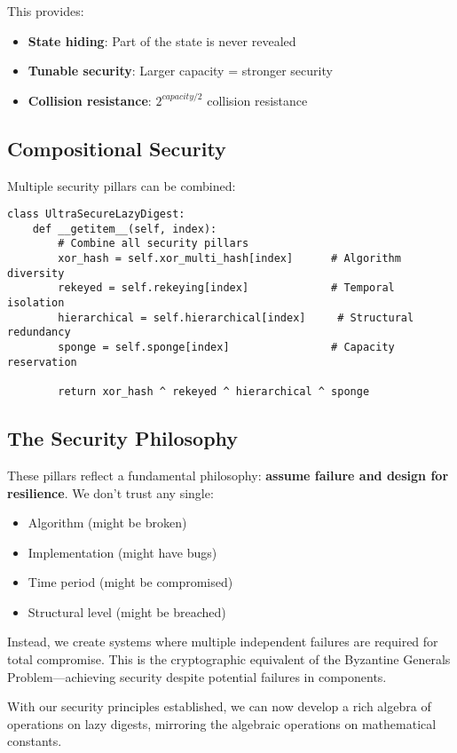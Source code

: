 \documentclass[11pt]{article}
\begin{document}
This provides:
\begin{itemize}
\item \textbf{State hiding}: Part of the state is never revealed
\item \textbf{Tunable security}: Larger capacity = stronger security
\item \textbf{Collision resistance}: $2^{capacity/2}$ collision resistance
\end{itemize}

\subsection{Compositional Security}

Multiple security pillars can be combined:

\begin{lstlisting}
class UltraSecureLazyDigest:
    def __getitem__(self, index):
        # Combine all security pillars
        xor_hash = self.xor_multi_hash[index]      # Algorithm diversity
        rekeyed = self.rekeying[index]             # Temporal isolation
        hierarchical = self.hierarchical[index]     # Structural redundancy
        sponge = self.sponge[index]                # Capacity reservation
        
        return xor_hash ^ rekeyed ^ hierarchical ^ sponge
\end{lstlisting}

\subsection{The Security Philosophy}

These pillars reflect a fundamental philosophy: \textbf{assume failure and design for resilience}. We don't trust any single:
\begin{itemize}
\item Algorithm (might be broken)
\item Implementation (might have bugs)
\item Time period (might be compromised)
\item Structural level (might be breached)
\end{itemize}

Instead, we create systems where multiple independent failures are required for total compromise. This is the cryptographic equivalent of the Byzantine Generals Problem---achieving security despite potential failures in components.

With our security principles established, we can now develop a rich algebra of operations on lazy digests, mirroring the algebraic operations on mathematical constants.
\end{document}
